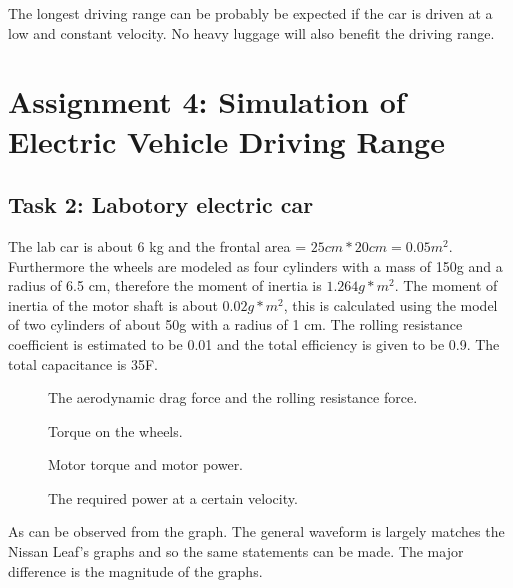 \documentclass[final]{scrreprt} %
\begin{document}
The longest driving range can be probably be expected if the car is driven at a low and constant velocity. No heavy luggage will also benefit the driving range.
\section{Assignment 4: Simulation of Electric Vehicle Driving Range}
\subsection{Task 2: Labotory electric car}

The lab car is about 6 kg and the frontal area = $25cm*20cm = 0.05 m^2$. Furthermore the wheels are modeled as four cylinders with a mass of 150g and a radius of 6.5 cm, therefore the moment of inertia is $1.264g*m^2$. The moment of inertia of the motor shaft is about $0.02g*m^2$, this is calculated using the model of two cylinders of about 50g with a radius of 1 cm. The rolling resistance coefficient is estimated to be 0.01 and the total efficiency is given to be 0.9. The total capacitance is 35F.

\begin{figure}[H]
	\centering
		\newlength\figureheight 
	\newlength\figurewidth 
    	\setlength\figureheight{4cm}
    	\setlength{}
    	
    	\label{fig:aero_and_rolling}
    	\caption{The aerodynamic drag force and the rolling resistance force.}
\end{figure}

\begin{figure}[H]
	\centering
    	\setlength\figureheight{4cm}
    	\setlength{}
    	
    	\label{fig:wheeltorque}
    	\caption{Torque on the wheels.}
\end{figure}

\begin{figure}[H]
	\centering
    	\setlength\figureheight{4cm}
    	\setlength{}
    	
    	\label{fig:motortorque}
    	\caption{Motor torque and motor power.}
\end{figure}

\begin{figure}[H]
	\centering
    	\setlength\figureheight{4cm}
    	\setlength{}
    	
    	\label{fig:reqpower}
    	\caption{The required power at a certain velocity.}
\end{figure}

As can be observed from the graph. The general waveform is largely matches the Nissan Leaf's graphs and so the same statements can be made. The major difference is the magnitude of the graphs.
\end{document}
